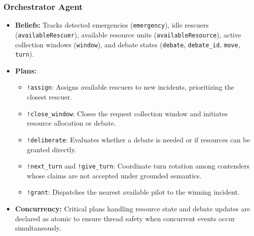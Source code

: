 \subsubsection{Orchestrator Agent}
\begin{itemize}
    \item \textbf{Beliefs:} Tracks detected emergencies (\texttt{emergency}), idle rescuers (\texttt{availableRescuer}), available resource units (\texttt{availableResource}), active collection windows (\texttt{window}), and debate states (\texttt{debate}, \texttt{debate\_id}, \texttt{move}, \texttt{turn}).
    \item \textbf{Plans:}
    \begin{itemize}
        \item \texttt{!assign}: Assigns available rescuers to new incidents, prioritizing the closest rescuer.
        \item \texttt{!close\_window}: Closes the request collection window and initiates resource allocation or debate.
        \item \texttt{!deliberate}: Evaluates whether a debate is needed or if resources can be granted directly.
        \item \texttt{!next\_turn} and \texttt{!give\_turn}: Coordinate turn rotation among contenders whose claims are not accepted under grounded semantics.
        \item \texttt{!grant}: Dispatches the nearest available pilot to the winning incident.
    \end{itemize}
    \item \textbf{Concurrency:} Critical plans handling resource state and debate updates are declared as atomic to ensure thread safety when concurrent events occur simultaneously.
\end{itemize}

